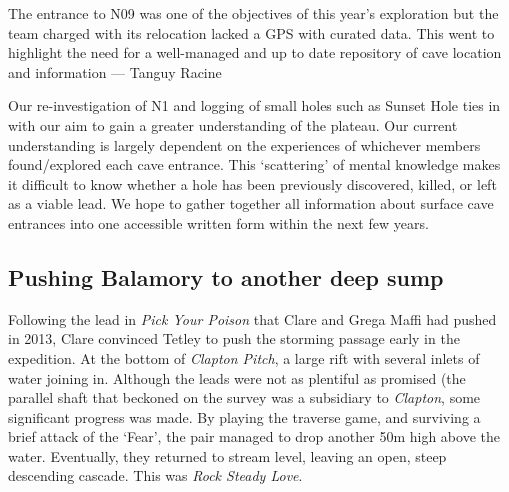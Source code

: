 \begin{pagefigure}
\checkoddpage \ifoddpage \forcerectofloat \else \forceversofloat \fi
\centering
{}
\caption{The entrance to N09  was one of the objectives of this year's exploration but the team charged with its relocation lacked a GPS with curated data. This went to highlight the need for a well-managed  and up to date repository of cave location and information --- Tanguy Racine}
\label{end of expo}
\end{pagefigure}

Our re-investigation of N1 and logging of small holes such as Sunset Hole ties in with our aim to gain a greater understanding of the plateau. Our current understanding is largely dependent on the experiences of whichever members found/explored each cave entrance. This ‘scattering’ of mental knowledge makes it difficult to know whether a hole has been previously discovered, killed, or left as a viable lead. We hope to gather together all information about surface cave entrances into one accessible written form within the next few years.


\subsection{Pushing Balamory to another deep sump}

Following the lead in \emph{Pick Your Poison} that Clare and Grega Maffi had pushed in 2013, Clare convinced Tetley to push the storming passage early in the expedition. At the bottom of \emph{Clapton Pitch}, a large rift with several inlets of water joining in.  Although the leads were not as plentiful as promised (the parallel shaft that beckoned on the survey was a subsidiary to \emph{Clapton}, some significant progress was made. By playing the traverse game, and surviving a brief attack of the ‘Fear', the pair managed to drop another 50m high above the water. Eventually, they returned to stream level, leaving an open, steep descending cascade. This was \emph{Rock Steady Love}.

